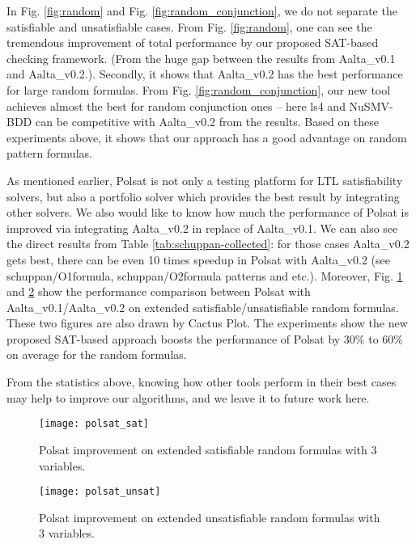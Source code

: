 \documentclass[conference]{IEEEtran}
\def\Aalta{{Aalta}}
\begin{document}
In Fig. \ref{fig:random} and Fig. \ref{fig:random_conjunction}, we do not
separate the satisfiable and unsatisfiable cases.  From
Fig. \ref{fig:random}, one can see the tremendous improvement of total
performance by our proposed SAT-based checking framework. (From the
huge gap between the results from \Aalta\_v0.1 and
\Aalta\_v0.2.). Secondly, it shows that \Aalta\_v0.2 has the best
performance for large random formulas. From
Fig. \ref{fig:random_conjunction}, our new tool achieves almost the
best for random conjunction ones -- here ls4 and NuSMV-BDD can be competitive
with \Aalta\_v0.2 from the results. Based on these experiments above,
it shows that our approach has a good advantage on random pattern
formulas.



As mentioned earlier, Polsat is not only a testing platform for LTL satisfiability
solvers, but also a portfolio solver which provides the best result by integrating other solvers. We also would like to know   how much the performance of Polsat is improved via integrating \Aalta\_v0.2 in replace of \Aalta\_v0.1.  We can also see the direct results from Table \ref{tab:schuppan-collected}: for those cases \Aalta\_v0.2 gets best, there
can be even 10 times speedup in Polsat with \Aalta\_v0.2 (see \textsf{schuppan/O1formula},
\textsf{schuppan/O2formula} patterns and etc.). Moreover, Fig. \ref{fig:polsat_sat} and
\ref{fig:polsat_unsat} show the performance comparison between Polsat with \Aalta\_v0.1/\Aalta\_v0.2 on
extended satisfiable/unsatisfiable random formulas. These two figures are also drawn by Cactus Plot. The experiments show the new proposed SAT-based approach boosts the performance of Polsat  by 30\% to 60\% on average for the random formulas. 


From the statistics above, knowing how other tools perform in their best cases may help to improve our algorithms, and we leave 
it to future work here. 


\begin{figure}
\centering
\texttt{[image: polsat\_sat]}
\caption{Polsat improvement on extended satisfiable random formulas with 3 variables.}
\label{fig:polsat_sat}
\end{figure}

\begin{figure}
\centering
\texttt{[image: polsat\_unsat]}
\caption{Polsat improvement on extended unsatisfiable random formulas with 3 variables.}
\label{fig:polsat_unsat}
\end{figure}
\end{document}
